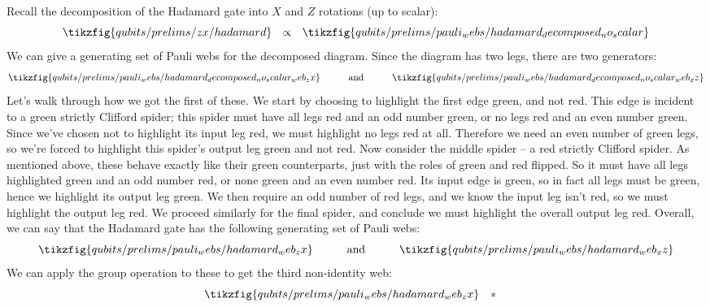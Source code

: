 \begin{example}
    Recall the decomposition of the Hadamard gate into $X$ and $Z$ rotations (up to scalar):
    \begin{equation}
        \tikzfig{qubits/prelims/zx/hadamard}
        ~~\propto~~
        \tikzfig{qubits/prelims/pauli_webs/hadamard_decomposed_no_scalar}
    \end{equation}
    We can give a generating set of Pauli webs for the decomposed diagram.
    Since the diagram has two legs, there are two generators:
    \begin{equation}
        \tikzfig{qubits/prelims/pauli_webs/hadamard_decomposed_no_scalar_web_zx}
        \qqquad \text{and} \qqquad
        \tikzfig{qubits/prelims/pauli_webs/hadamard_decomposed_no_scalar_web_xz}
    \end{equation}
    Let's walk through how we got the first of these.
    We start by choosing to highlight the first edge green, and not red.
    This edge is incident to a green strictly Clifford spider; this spider must have all legs red and an odd number green, or no legs red and an even number green.
    Since we've chosen not to highlight its input leg red, we must highlight no legs red at all.
    Therefore we need an even number of green legs, so we're forced to highlight this spider's output leg green and not red.
    Now consider the middle spider -- a red strictly Clifford spider.
    As mentioned above, these behave exactly like their green counterparts, just with the roles of green and red flipped.
    So it must have all legs highlighted green and an odd number red, or none green and an even number red.
    Its input edge is green, so in fact all legs must be green, hence we highlight its output leg green.
    We then require an odd number of red legs, and we know the input leg isn't red, so we must highlight the output leg red.
    We proceed similarly for the final spider, and conclude we must highlight the overall output leg red.
    Overall, we can say that the Hadamard gate has the following generating set of Pauli webs:
    \begin{equation}
        \tikzfig{qubits/prelims/pauli_webs/hadamard_web_zx}
        \qqquad \text{and} \qqquad
        \tikzfig{qubits/prelims/pauli_webs/hadamard_web_xz}
    \end{equation}
    We can apply the group operation to these to get the third non-identity web:
    \begin{equation}
        \tikzfig{qubits/prelims/pauli_webs/hadamard_web_zx}
        \quad * \quad

\end{equation}
\end{example}
